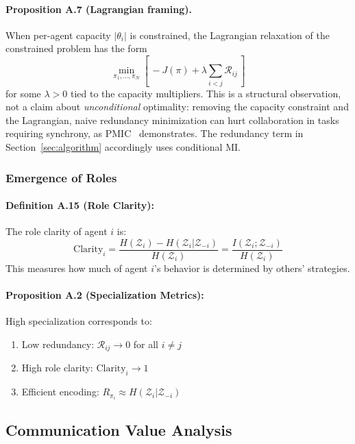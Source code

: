\documentclass[10pt, letterpaper]{article}
\begin{document}
\paragraph{Proposition A.7 (Lagrangian framing).} When per-agent capacity $|\theta_i|$ is constrained, the Lagrangian relaxation of the constrained problem has the form
\[\min_{\pi_1,\ldots,\pi_N} \left[\, -J(\pi) + \lambda \sum_{i<j} \mathcal{R}_{ij} \,\right]\]
for some $\lambda > 0$ tied to the capacity multipliers. This is a structural observation, not a claim about \emph{unconditional} optimality: removing the capacity constraint and the Lagrangian, naive redundancy minimization can hurt collaboration in tasks requiring synchrony, as PMIC~\cite{li2022pmic} demonstrates. The redundancy term in Section~\ref{sec:algorithm} accordingly uses conditional MI.

\subsubsection{Emergence of Roles}

\paragraph{Definition A.15 (Role Clarity):} The role clarity of agent $i$ is:
\[\text{Clarity}_i = \frac{H(\mathcal{Z}_i) - H(\mathcal{Z}_i | \mathcal{Z}_{-i})}{H(\mathcal{Z}_i)} = \frac{I(\mathcal{Z}_i; \mathcal{Z}_{-i})}{H(\mathcal{Z}_i)}\]
This measures how much of agent $i$'s behavior is determined by others' strategies.

\paragraph{Proposition A.2 (Specialization Metrics):} High specialization corresponds to:
\begin{enumerate}
    \item Low redundancy: $\mathcal{R}_{ij} \to 0$ for all $i \neq j$
    \item High role clarity: $\text{Clarity}_i \to 1$
    \item Efficient encoding: $R_{\pi_i} \approx H(\mathcal{Z}_i | \mathcal{Z}_{-i})$
\end{enumerate}

\subsection{Communication Value Analysis}
\end{document}
